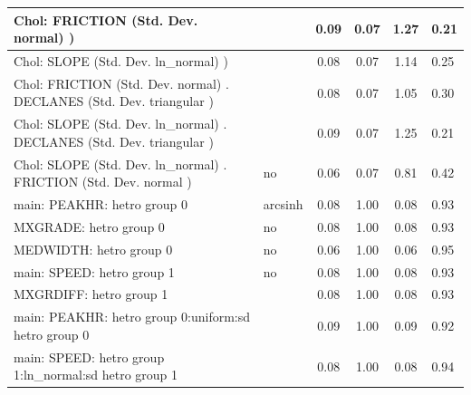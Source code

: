 \begin{table}
\begin{center}
\begin{tabular}{|l|l|c|c|c|l|}
			\hline
			 Chol: FRICTION (Std. Dev. normal) ) &  & 0.09 & 0.07 & 1.27 & 0.21 \\
			\hline
			 Chol: SLOPE (Std. Dev. ln_normal) ) &  & 0.08 & 0.07 & 1.14 & 0.25 \\
			\hline
			 Chol: FRICTION (Std. Dev. normal) . DECLANES (Std. Dev.   triangular ) &  & 0.08 & 0.07 & 1.05 & 0.30 \\
			\hline
			 Chol: SLOPE (Std. Dev. ln_normal) . DECLANES (Std. Dev.   triangular ) &  & 0.09 & 0.07 & 1.25 & 0.21 \\
			\hline
			 Chol: SLOPE (Std. Dev. ln_normal) . FRICTION (Std. Dev.   normal ) & no & 0.06 & 0.07 & 0.81 & 0.42 \\
			\hline
			main: PEAKHR: hetro group 0 & arcsinh & 0.08 & 1.00 & 0.08 & 0.93 \\
			\hline
			MXGRADE: hetro group 0 & no & 0.08 & 1.00 & 0.08 & 0.93 \\
			\hline
			MEDWIDTH: hetro group 0 & no & 0.06 & 1.00 & 0.06 & 0.95 \\
			\hline
			main: SPEED: hetro group 1 & no & 0.08 & 1.00 & 0.08 & 0.93 \\
			\hline
			MXGRDIFF: hetro group 1 &  & 0.08 & 1.00 & 0.08 & 0.93 \\
			\hline
			main: PEAKHR: hetro group 0:uniform:sd  hetro group 0 &  & 0.09 & 1.00 & 0.09 & 0.92 \\
			\hline
			main: SPEED: hetro group 1:ln_normal:sd  hetro group 1 &  & 0.08 & 1.00 & 0.08 & 0.94 \\
			\hline
		\end{tabular}
	\end{center}
\end{table}